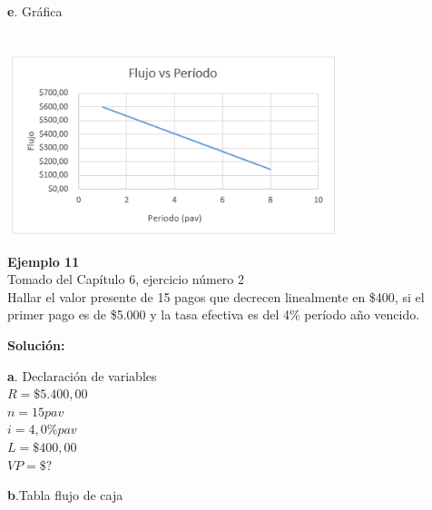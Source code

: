 \\
\\\\
\textbf{e}. Gráfica\\
\ \begin{center}
	\includegraphics[height=5.4cm]{img/ch8/8_22.png}
\end{center}
\textbf{Ejemplo 11}\\

Tomado del Capítulo 6, ejercicio número 2
\\

Hallar el valor presente de 15 pagos que decrecen linealmente en \$400, si el primer pago es de \$5.000 y la tasa efectiva es del 4\% período año vencido.

\vspace{2mm}

\textbf{Solución:}

\textbf{a}. Declaración de variables\\


	    $R=\$5.400,00$
	    \\
	    $	n=15 pav$ 
	    \\
		$i=4,0\% pav$
		\\
		$L=\$400,00$\\
		$VP=\$?$

\textbf{b}.Tabla flujo de caja

